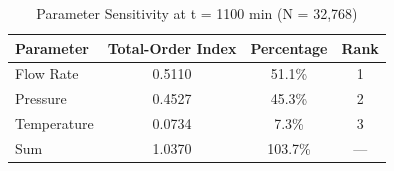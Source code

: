 \begin{table}[htbp]
\centering
\caption{Parameter Sensitivity at t = 1100 min (N = 32,768)}
\label{tab:sensitivity}
\begin{tabular}{lccc}
\hline\hline
Parameter & Total-Order Index & Percentage & Rank \\
\hline
Flow Rate & 0.5110 & 51.1\% & 1 \\
Pressure & 0.4527 & 45.3\% & 2 \\
Temperature & 0.0734 & 7.3\% & 3 \\
\hline
Sum & 1.0370 & 103.7\% & --- \\
\hline\hline
\end{tabular}
\end{table}
